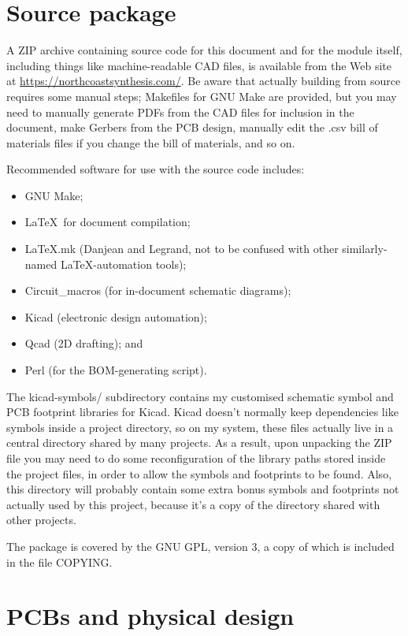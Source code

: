 \section{Source package}

A ZIP archive containing source code for this document and for the module
itself, including things like machine-readable CAD files, is available from 
the Web site at 
\url{https://northcoastsynthesis.com/}.  Be aware that actually building
from source requires some manual steps; Makefiles for GNU Make are provided,
but you may need to manually generate PDFs from the CAD files for inclusion
in the document, make Gerbers from the PCB design, manually edit the .csv
bill of materials files if you change the bill of materials, and so on.

Recommended software for use with the source code includes:
\begin{itemize}
  \item GNU Make;
  \item \LaTeX\ for document compilation;
  \item LaTeX.mk (Danjean and Legrand, not to be confused with other
    similarly-named \LaTeX-automation tools);
  \item Circuit\_macros (for in-document schematic diagrams);
  \item Kicad (electronic design automation);
  \item Qcad (2D drafting); and
  \item Perl (for the BOM-generating script).
\end{itemize}

The kicad-symbols/ subdirectory contains my customised schematic symbol and
PCB footprint libraries for Kicad.  Kicad doesn't normally keep dependencies
like symbols inside a project directory, so on my system, these files
actually live in a central directory shared by many projects.  As a result,
upon unpacking the ZIP file you may need to do some reconfiguration of the
library paths stored inside the project files, in order to allow the symbols
and footprints to be found.  Also, this directory will probably contain some
extra bonus symbols and footprints not actually used by this project,
because it's a copy of the directory shared with other projects.

The package is covered by the GNU GPL, version 3, a copy of which is
included in the file COPYING.

\section{PCBs and physical design}

